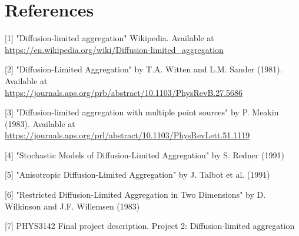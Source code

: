 \documentclass[10pt]{article}
\begin{document}




\newpage

\section{References}

\label{ref1}
[1] "Diffusion-limited aggregation" Wikipedia. Available at \href{https://en.wikipedia.org/wiki/Diffusion-limited_aggregation}{https://en.wikipedia.org/wiki/Diffusion-limited\_aggregation}

\label{ref2}
[2] "Diffusion-Limited Aggregation" by T.A. Witten and L.M. Sander (1981). Available at\\ \href{https://journals.aps.org/prb/abstract/10.1103/PhysRevB.27.5686}{https://journals.aps.org/prb/abstract/10.1103/PhysRevB.27.5686}

\label{ref3}
[3] "Diffusion-limited aggregation with multiple point sources" by P. Meakin (1983). Available at\\ \href{https://journals.aps.org/prl/abstract/10.1103/PhysRevLett.51.1119}{https://journals.aps.org/prl/abstract/10.1103/PhysRevLett.51.1119}

\label{ref4}
[4] "Stochastic Models of Diffusion-Limited Aggregation" by S. Redner (1991)

\label{ref5}
[5] "Anisotropic Diffusion-Limited Aggregation" by J. Talbot et al. (1991)

\label{ref6}
[6] "Restricted Diffusion-Limited Aggregation in Two Dimensions" by D. Wilkinson and J.F. Willemsen (1983)

\label{ref7}
[7] PHYS3142 Final project description. Project 2: Diffusion-limited aggregation
\end{document}
